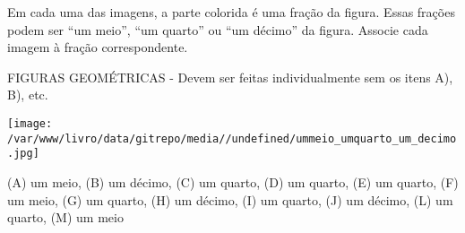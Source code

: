 \documentclass[a4paper,12pt,twoside]{book}
\begin{document}
Em cada uma das imagens, a parte colorida é uma fração da figura. Essas frações podem ser ``um meio'', ``um quarto'' ou ``um décimo'' da figura. Associe cada imagem à fração correspondente.

\begin{imagem*}[breakable]{}{}   FIGURAS GEOMÉTRICAS - Devem ser feitas individualmente sem os itens A), B), etc.  
  
    \texttt{[image: /var/www/livro/data/gitrepo/media//undefined/ummeio\_umquarto\_um\_decimo.jpg]}  
  
  
\end{imagem*}


\begin{resposta*}[breakable]{}{}   (A) um meio,  (B) um décimo, (C) um quarto, (D) um quarto,  \mbox{} \newline   
  (E) um quarto, (F) um meio, (G) um quarto, (H) um décimo,  \mbox{} \newline   
  (I) um quarto, (J) um décimo, (L) um quarto, (M) um meio  
\end{resposta*}
\end{document}
